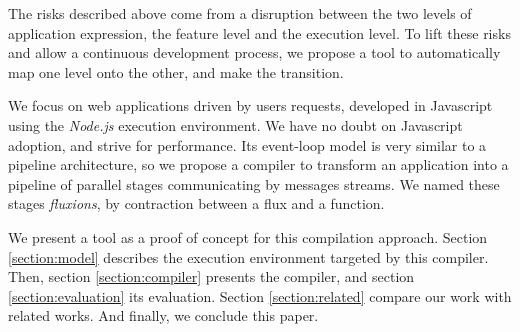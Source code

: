 The risks described above come from a disruption between the two levels of application expression, the feature level and the execution level.
To lift these risks and allow a continuous development process, we propose a tool to automatically map one level onto the other, and make the transition.

We focus on web applications driven by users requests, developed in Javascript using the \textit{Node.js} execution environment.
We have no doubt on Javascript adoption, and strive for performance.
Its event-loop model is very similar to a pipeline architecture, so we 
propose a compiler to transform an application into a pipeline of parallel stages communicating by messages streams.
We named these stages \textit{fluxions}, by contraction between a flux and a function.

We present %
a tool as a proof of concept for this compilation approach.
Section \ref{section:model} describes the execution environment targeted by this compiler.
Then, section \ref{section:compiler} presents the compiler, and section \ref{section:evaluation} its evaluation.
Section \ref{section:related} compare our work with related works.
And finally, we conclude this paper.